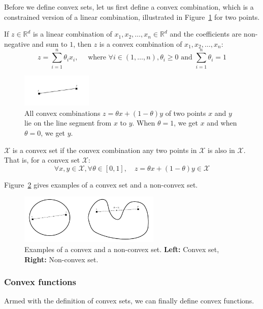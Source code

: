 \documentclass{article}
\newcommand{\R}{\mathbb{R}}
\newcommand{\X}{\mathcal{X}}
\begin{document}
Before we define convex sets, let us first define a convex combination, which is a constrained version of a linear combination, illustrated in Figure~\ref{fig:two_points} for two points.

\begin{defn}
If $z \in \R^d$ is a linear combination of $x_1, x_2,\ldots,x_n \in \R^d$ and the coefficients are non-negative and sum to $1$, then $z$ is a convex combination of $x_1, x_2,\ldots,x_n$:
\[
    z = \sum_{i=1}^n\theta_i x_i, \quad\text{ where } \forall i \in (1,\ldots,n), \theta_i \geq 0 \text{ and } \sum_{i=1}^n \theta_i = 1
\]
\end{defn}

\begin{figure}[ht]
\centering
    \includegraphics[width=0.3\textwidth]{figures/line_two_points.pdf}
    \caption{All convex combinations $z = \theta x + (1-\theta)y$ of two points $x$ and $y$ lie on the line segment from $x$ to $y$. When $\theta=1$, we get $x$ and when $\theta=0$, we get $y$.}
    \label{fig:two_points}
\end{figure}


\begin{defn}
$\X$ is a convex set if the convex combination any two points in $\X$ is also in $\X$. That is, for a convex set $\X$:
\[
\forall x,y \in \X, \forall \theta \in  [0, 1],\quad z = \theta x + (1-\theta)y \in \X
\]
\end{defn}

Figure~\ref{fig:sets} gives examples of a convex set and a non-convex set.

\begin{figure}[ht]
\centering
    \includegraphics[width=0.6\textwidth]{figures/sets.pdf}%
    \caption{Examples of a convex and a non-convex set. \textbf{Left:} Convex set, \textbf{Right:} Non-convex set.}
    \label{fig:sets}
\end{figure}


\subsubsection{Convex functions}
Armed with the definition of convex sets,
we can finally define convex functions.
\end{document}
